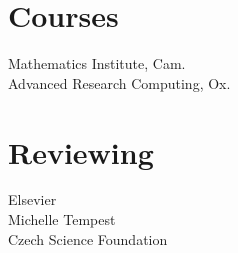 \documentclass[a4paper]{custom-resume}
\begin{document}
\begin{minipage}[t][0.8\textheight]{0.33\textwidth}

\section{Courses}

\begin{flushleft}
 Mathematics Institute, Cam. \\ \vspace{4pt}
      Advanced Research Computing, Ox.
\end{flushleft}


\section{Reviewing}

\begin{flushleft}
 Elsevier \\ \vspace{4pt}
 Michelle Tempest \\ \vspace{4pt}
 Czech Science Foundation
\end{flushleft}

\end{minipage}
\hfill
\end{document}
